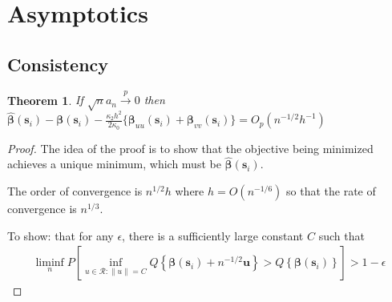 \documentclass[authoryear, review, 11pt]{elsarticle}
\newtheorem{theorem}{Theorem}[section]
\begin{document}
  
\section{Asymptotics}
  \subsection{Consistency}
  \begin{theorem}\label{theorem:consistency}     
    If $\sqrt{n} a_n \xrightarrow{p} 0$ then $\hat{\bm{\beta}}(\bm{s}_i) - \bm{\beta}(\bm{s}_i) - \frac{\kappa_2 h^2}{2 \kappa_0} \{ \bm{\beta}_{uu}(\bm{s}_i) + \bm{\beta}_{vv}(\bm{s}_i) \} = O_p(n^{-1/2} h^{-1} )$
  \end{theorem}
  
  \begin{proof}
    The idea of the proof is to show that the objective being minimized achieves a unique minimum, which must be $\hat{\bm{\beta}}(\bm{s}_i)$.
    
    The order of convergence is $n^{1/2} h$ where $h = O(n^{-1/6})$ so that the rate of convergence is $n^{1/3}$.
    
    To show: that for any $\epsilon$, there is a sufficiently large constant $C$ such that
    \begin{align*}
      \liminf \limits_n P \left[ \inf_{u \in \mathcal{R}: \|u\| = C} Q \left\{ \bm{\beta}(\bm{s}_i) + n^{-1/2} \bm{u} \right\} > Q \left\{ \bm{\beta}(\bm{s}_i) \right\} \right] > 1 - \epsilon
    \end{align*}
    

\end{proof}
\end{document}
